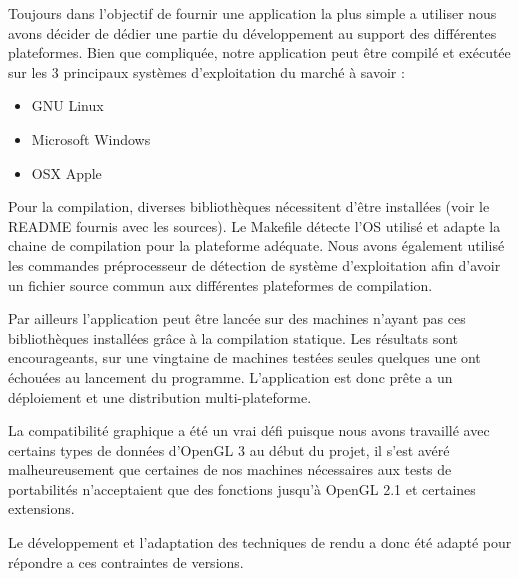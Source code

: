 Toujours dans l’objectif de fournir une application la plus simple a utiliser nous avons décider de dédier une partie du développement au support des différentes plateformes. Bien que compliquée, notre application peut être compilé et exécutée sur les 3 principaux systèmes d’exploitation du marché à savoir :

\begin{itemize}
 \item GNU Linux
 \item Microsoft Windows
 \item OSX Apple
\end{itemize}

Pour la compilation, diverses bibliothèques nécessitent d’être installées (voir le README fournis avec les sources). Le Makefile détecte l’OS utilisé et adapte la chaine de compilation pour la plateforme adéquate. Nous avons également utilisé les commandes préprocesseur de détection de système d’exploitation afin d’avoir un fichier source commun aux différentes plateformes de compilation.

Par ailleurs l’application peut être lancée sur des machines n’ayant pas ces bibliothèques installées grâce à la compilation statique. Les résultats sont encourageants, sur une vingtaine de machines testées seules quelques une ont échouées au lancement du programme. L’application est donc prête a un déploiement et une distribution multi-plateforme.

La compatibilité graphique a été un vrai défi puisque nous avons travaillé avec certains types de données d’OpenGL 3 au début du projet, il s’est avéré malheureusement que certaines de nos machines nécessaires aux tests de portabilités n’acceptaient que des fonctions jusqu’à OpenGL 2.1 et certaines extensions. 

Le développement et l’adaptation des techniques de rendu a donc été adapté pour répondre a ces contraintes de versions.